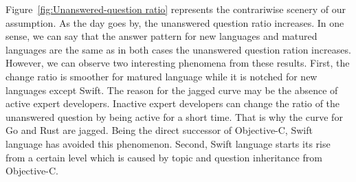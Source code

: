 Figure~\ref{fig:Unanswered-question ratio} represents the contrariwise scenery of our assumption. As the day goes by, the unanswered question ratio increases. In one sense, we can say that the answer pattern for new languages and matured languages are the same as in both cases the unanswered question ration increases. However, we can observe two interesting phenomena from these results. First, the change ratio is smoother for matured language while it is notched for new languages except Swift. The reason for the jagged curve may be the absence of active expert developers. Inactive expert developers can change the ratio of the unanswered question by being active for a short time. That is why the curve for Go and Rust are jagged. Being the direct successor of Objective-C, Swift language has avoided this phenomenon. Second, Swift language starts its rise from a certain level which is caused by topic and question inheritance from Objective-C.

